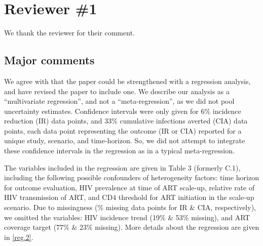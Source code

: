 \section{Reviewer \#1}
\begin{comment}[*]
This paper by Knight and colleagues reviews mathematical models of the impact of antiretroviral treatment (ART) on HIV incidence. A particular focus is on differences between models in terms of how they represent heterogeneity in HIV risk, and how this heterogeneity influences the predicted impact of ART on HIV incidence. The review is thorough and clearly presented.
\end{comment}
\begin{response}
We thank the reviewer for their comment.
\end{response}
\subsection{Major comments}
\begin{comment}\label{reg.1}
A limitation of this review, which the authors acknowledge, is that it is essentially an ecological analysis. Although there is an association between models allowing for heterogeneity in risk behaviour and models predicting smaller ART impacts on HIV incidence, this finding doesn't necessarily prove that heterogeneity in risk behaviour determines the extent of the ART impact. There are many possible confounders and other variables that influence the extent of the modelled reductions in HIV incidence, as the authors note. Would it not make more sense to use a meta-regression approach to isolate the effect of the heterogeneity assumptions, controlling for the confounding factors? Although this wouldn't completely get around the causality conundrum, it would be better than the current approach, which is effectively relying on univariable rather than multivariable analysis.
\end{comment}
\begin{response}
We agree with that the paper could be strengthened with a regression analysis,
and have revised the paper to include one.
We describe our analysis as a ``multivariate regression'', and not a ``meta-regression'',
as we did not pool uncertainty estimates.
Confidence intervals were only given for
6\% incidence reduction (IR) data points, and
33\% cumulative infections averted (CIA) data points,
each data point representing the outcome (IR or CIA) reported for a unique study, scenario, and time-horizon.
So, we did not attempt to integrate these confidence intervals in the regression as in a typical meta-regression.
\par
The variables included in the regression are given in Table 3 (formerly C.1),
including the following possible confounders of heterogeneity factors:
time horizon for outcome evaluation,
HIV prevalence at time of ART scale-up,
relative rate of HIV transmission of ART, and
CD4 threshold for ART initiation in the scale-up scenario.
Due to missingness (\% missing data points for IR \& CIA, respectively), we omitted the variables:
HIV incidence trend (19\% \& 53\% missing), and ART coverage target (77\% \& 23\% missing).
More details about the regression are given in \ref{reg.2}.
\end{response}
